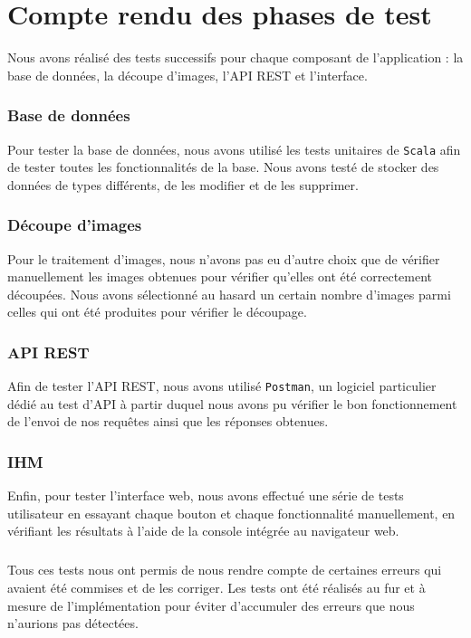 \chapter{Compte rendu des phases de test}

Nous avons réalisé des tests successifs pour chaque composant de l'application : la base de données, la découpe d'images, l'API REST et l'interface.

\subsection{Base de données}
Pour tester la base de données, nous avons utilisé les tests unitaires de \texttt{Scala} afin de tester toutes les fonctionnalités de la base. Nous avons testé de stocker des données de types différents, de les modifier et de les supprimer.

\subsection{Découpe d'images}
Pour le traitement d'images, nous n'avons pas eu d'autre choix que de vérifier manuellement les images obtenues pour vérifier qu'elles ont été correctement découpées. Nous avons sélectionné au hasard un certain nombre d'images parmi celles qui ont été produites pour vérifier le découpage.

\subsection{API REST}
Afin de tester l'API REST, nous avons utilisé \texttt{Postman}, un logiciel particulier dédié au test d'API à partir duquel nous avons pu vérifier le bon fonctionnement de l'envoi de nos requêtes ainsi que les réponses obtenues.

\subsection{IHM}
Enfin, pour tester l'interface web, nous avons effectué une série de tests utilisateur en essayant chaque bouton et chaque fonctionnalité manuellement, en vérifiant les résultats à l'aide de la console intégrée au navigateur web.

\paragraph{}
Tous ces tests nous ont permis de nous rendre compte de certaines erreurs qui avaient été commises et de les corriger. Les tests ont été réalisés au fur et à mesure de l'implémentation pour éviter d'accumuler des erreurs que nous n'aurions pas détectées.